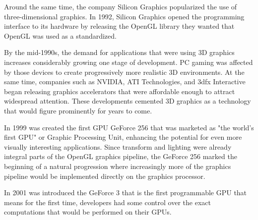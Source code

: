 \documentclass[Ingles]{ic-tese-v1}
\begin{document}
Around the same time, the company Silicon Graphics popularized the use
of three-dimensional graphics. In 1992, Silicon Graphics opened the
programming interface to its hardware by releasing the OpenGL library they wanted
that OpenGL was used as a standardized.

By the mid-1990s, the demand for applications that were using 3D graphics
increases considerably growing one stage of development. PC gaming was affected
by those devices to create progressively more realistic 3D environments.
At the same time, companies such as NVIDIA, ATI Technologies,
and 3dfx Interactive began releasing graphics accelerators that were affordable
enough to attract widespread attention. These developments cemented 3D
graphics as a technology that would figure prominently for years to come.

In 1999 was created the first GPU GeForce 256 that was marketed as "the world's
first GPU" or Graphic Processing Unit, enhancing the potential
for even more visually interesting applications. Since transform and lighting were
already integral parts of the OpenGL graphics pipeline, the GeForce 256 marked
the beginning of a natural progression where increasingly more of the graphics
pipeline would be implemented directly on the graphics processor.

In 2001 was introduced the GeForce 3 that is the first programmable GPU that means
for the first time, developers had some control over the exact computations
that would be performed on their GPUs.
\end{document}
